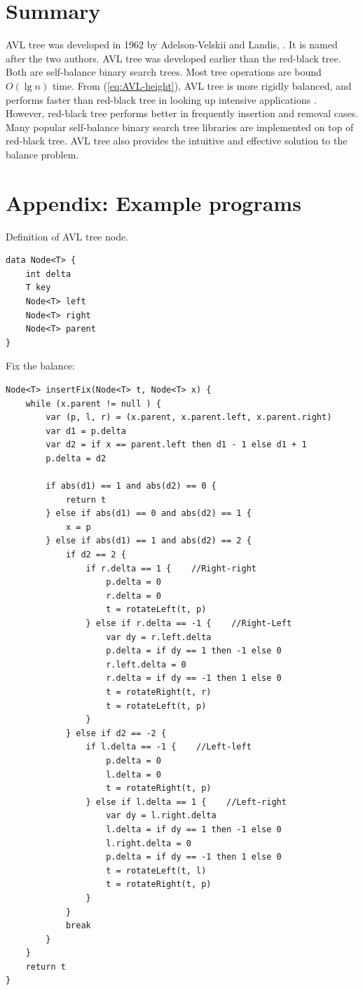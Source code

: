 \documentclass[b5paper]{article}
\begin{document}
\section{Summary}
AVL tree was developed in 1962 by Adelson-Velskii and Landis\cite{wiki-avl}, \cite{TFATP}. It is named after the two authors. AVL tree was developed earlier than the red-black tree. Both are self-balance binary search trees. Most tree operations are bound $O(\lg n)$ time. From (\ref{eq:AVL-height}), AVL tree is more rigidly balanced, and performs faster than red-black tree in looking up intensive applications \cite{wiki-avl}. However, red-black tree performs better in frequently insertion and removal cases. Many popular self-balance binary search tree libraries are implemented on top of red-black tree. AVL tree also provides the intuitive and effective solution to the balance problem.

\section{Appendix: Example programs}

Definition of AVL tree node.

\begin{lstlisting}[language = Bourbaki]
data Node<T> {
    int delta
    T key
    Node<T> left
    Node<T> right
    Node<T> parent
}
\end{lstlisting}

Fix the balance:

\begin{lstlisting}[language = Bourbaki]
Node<T> insertFix(Node<T> t, Node<T> x) {
    while (x.parent != null ) {
        var (p, l, r) = (x.parent, x.parent.left, x.parent.right)
        var d1 = p.delta
        var d2 = if x == parent.left then d1 - 1 else d1 + 1
        p.delta = d2

        if abs(d1) == 1 and abs(d2) == 0 {
            return t
        } else if abs(d1) == 0 and abs(d2) == 1 {
            x = p
        } else if abs(d1) == 1 and abs(d2) == 2 {
            if d2 == 2 {
                if r.delta == 1 {    //Right-right
                    p.delta = 0
                    r.delta = 0
                    t = rotateLeft(t, p)
                } else if r.delta == -1 {    //Right-Left
                    var dy = r.left.delta
                    p.delta = if dy == 1 then -1 else 0
                    r.left.delta = 0
                    r.delta = if dy == -1 then 1 else 0
                    t = rotateRight(t, r)
                    t = rotateLeft(t, p)
                }
            } else if d2 == -2 {
                if l.delta == -1 {    //Left-left
                    p.delta = 0
                    l.delta = 0
                    t = rotateRight(t, p)
                } else if l.delta == 1 {    //Left-right
                    var dy = l.right.delta
                    l.delta = if dy == 1 then -1 else 0
                    l.right.delta = 0
                    p.delta = if dy == -1 then 1 else 0
                    t = rotateLeft(t, l)
                    t = rotateRight(t, p)
                }
            }
            break
        }
    }
    return t
}
\end{lstlisting}
\end{document}

